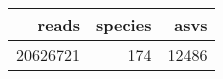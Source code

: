 \begin{longtable}{rrr}
  \hline
reads & species & asvs \\ 
  \hline
20626721 & 174 & 12486 \\ 
   \hline
\hline
\end{longtable}
